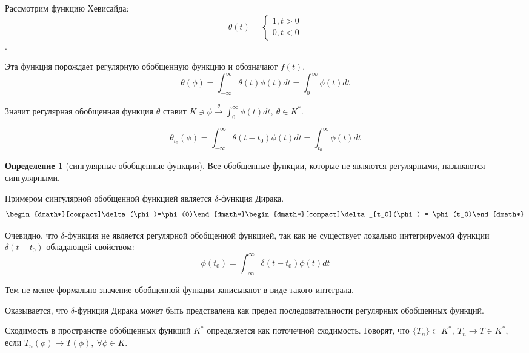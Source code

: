 \documentclass[14pt,a4paper]{extarticle}
\theoremstyle{definition}
\newtheorem{definition}{Определение}[section]
\theoremstyle{remark}
\renewcommand{\[}{\begin{dmath*}[compact]}
\renewcommand{\]}{\end{dmath*}}
\newcommand{\sep}{ , \ \allowbreak }
\begin{document}
Рассмотрим функцию Хевисайда:
\[\theta (t) = \begin{cases}
1, t>0 \\ 0, t<0\end{cases}\].

Эта функция порождает регулярную обобщенную функцию и обозначают $f(t)$.
\[\theta (\phi) = \int_{-\infty}^\infty \theta (t)\phi(t)dt
= \int_0^\infty \phi(t)dt\]

Значит регулярная обобщенная функция $\theta$ ставит
$K \ni \phi \overset{\theta}{\to} \int_0^\infty \phi(t) dt \sep \theta \in K^*$.

\[\theta _{t_0}(\phi)=\int_{-\infty}^\infty \theta (t-t_0)\phi(t)dt
= \int_{t_0}^\infty \phi (t)dt\]

\begin{definition}[сингулярные обобщенные функции]
  Все обобщенные функции, которые не являются регулярными,
  называются сингулярными.
\end{definition}

Примером сингулярной обобщенной функцией является $\delta$-функция Дирака.
\begin{dgroup*}
\[\delta(\phi)=\phi(0)\]
\[\delta_{t_0}(\phi) = \phi(t_0)\]
\end{dgroup*}

Очевидно, что $\delta$-функция не является регулярной обобщенной функцией,
так как не существует локально интегрируемой функции $\delta(t-t_0)$
обладающей свойством:
\[\phi(t_0) = \int_{-\infty}^\infty \delta (t-t_0)\phi(t)dt\]

Тем не менее формально значение обобщенной функции записывают в виде
такого интеграла.

Оказывается, что $\delta$-функция Дирака может быть предствалена как
предел последовательности регулярных обобщенных функций.

Сходимость в пространстве обобщенных функций $K^*$ определяется
как поточечной сходимость.
Говорят, что $\{T_n\} \subset K^* \sep T_n \to T \in K^*$,
если $T_n(\phi) \to T(\phi) \sep \forall \phi \in K$.


\listoftheorems

\end{document}

